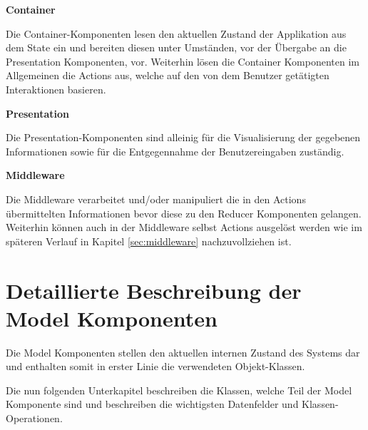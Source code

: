 \documentclass[bibliography=totoc,listof=totoc,BCOR=5mm,DIV=12,oneside]{scrbook}
\begin{document}
\par \bigskip \textbf{Container}
\par Die Container-Komponenten lesen den aktuellen Zustand der Applikation aus dem State ein und bereiten diesen unter Umständen, vor der Übergabe an die Presentation Komponenten, vor. Weiterhin lösen die Container Komponenten im Allgemeinen die Actions aus, welche auf den von dem Benutzer getätigten Interaktionen basieren.

\par \bigskip \textbf{Presentation}
\par Die Presentation-Komponenten sind alleinig für die Visualisierung der gegebenen Informationen sowie für die Entgegennahme der Benutzereingaben zuständig.

\par \bigskip \textbf{Middleware}
\par Die Middleware verarbeitet und/oder manipuliert die in den Actions übermittelten Informationen bevor diese zu den Reducer Komponenten gelangen. Weiterhin können auch in der Middleware selbst Actions ausgelöst werden wie im späteren Verlauf in Kapitel \ref{sec:middleware} nachzuvollziehen ist. 

\newpage
\section{Detaillierte Beschreibung der Model Komponenten}
\label{sec:komponentenDetails}
\par Die Model Komponenten stellen den aktuellen internen Zustand des Systems dar und enthalten somit in erster Linie die verwendeten Objekt-Klassen. 
\par \medskip Die nun folgenden Unterkapitel beschreiben die Klassen, welche Teil der Model Komponente sind und beschreiben die wichtigsten Datenfelder und Klassen-Operationen.
\end{document}
